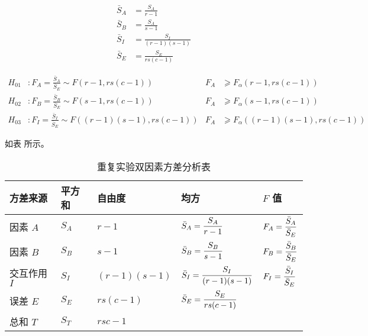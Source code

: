 \begin{align}
    \bar{S}_A & = \frac{S_A}{r-1} \\
    \bar{S}_B & = \frac{S_A}{s-1} \\
    \bar{S}_I & = \frac{S_I}{(r-1)(s-1)} \\
    \bar{S}_E & = \frac{S_E}{rs(c-1)}
\end{align}

\begin{align}
    H_{01} &: F_A = \frac{\bar{S}_A}{\bar{S}_E} \sim F(r-1, rs(c-1)) & F_A & ⩾ F_α(r-1, rs(c-1)) \\
    H_{02} &: F_B = \frac{\bar{S}_B}{\bar{S}_E} \sim F(s-1, rs(c-1)) & F_A & ⩾ F_α(s-1, rs(c-1)) \\
    H_{03} &: F_I = \frac{\bar{S}_I}{\bar{S}_E} \sim F((r-1)(s-1), rs(c-1)) & F_A & ⩾ F_α((r-1)(s-1), rs(c-1))
\end{align}

 如表 所示。

\begin{table}[hbtp]
    \renewcommand{\arraystretch}{2}
    \centering
    \caption{重复实验双因素方差分析表}
    \label{tab:重复实验双因素方差分析表}
    \begin{tabular}{l|l|l|l|l} \hline
        方差来源       & 平方和  & 自由度         & 均方                                       & $ F $ 值 \\\hline
        因素 $ A $     & $ S_A $ & $ r-1 $        & $ \displaystyle \bar{S}_A = \frac{S_A}{r-1} $        & $ \displaystyle F_A = \frac{\bar{S}_A}{\bar{S}_E} $ \\
        因素 $ B $     & $ S_B $ & $ s-1 $        & $ \displaystyle \bar{S}_B = \frac{S_B}{s-1} $        & $ \displaystyle F_B = \frac{\bar{S}_B}{\bar{S}_E} $ \\
        交互作用 $ I $ & $ S_I $ & $ (r-1)(s-1) $ & $ \displaystyle \bar{S}_I = \frac{S_I}{(r-1)(s-1)} $ & $ \displaystyle F_I = \frac{\bar{S}_I}{\bar{S}_E} $ \\
        误差 $ E $     & $ S_E $ & $ rs(c-1) $    & $ \displaystyle \bar{S}_E = \frac{S_E}{rs(c-1)} $    & \\
        总和 $ T $     & $ S_T $ & $ rsc-1 $      &                                            & \\\hline
    \end{tabular}
\end{table}